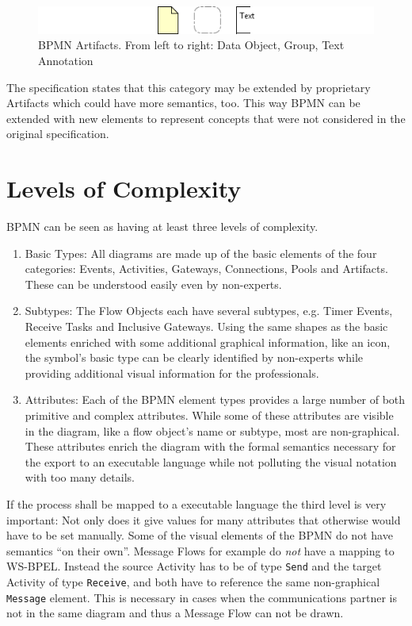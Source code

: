 \begin{figure}[ht]
	\centering
	\includegraphics[width=.75\textwidth]{figures/bpmn/artifacts.png}
	\caption[BPMN Artifacts]{BPMN Artifacts. From left to right: Data Object, Group, Text Annotation}
	\label{fig:artifacts}
\end{figure}

The specification states that this category may be extended by proprietary Artifacts which could
have more semantics, too. This way BPMN can be extended with new elements to represent concepts that
were not considered in the original specification.


\section{Levels of Complexity}
\label{sec:bpmn_complexity}

BPMN can be seen as having at least three levels of complexity.

\begin{enumerate}
	\item Basic Types: All diagrams are made up of the basic elements of the four categories:
	Events, Activities, Gateways, Connections, Pools and Artifacts. These can be understood easily
	even by non-experts.
	\item Subtypes: The Flow Objects each have several subtypes, e.g. Timer Events, Receive Tasks
	and Inclusive Gateways. Using the same shapes as the basic elements enriched with some
	additional graphical information, like an icon, the symbol's basic type can be clearly
	identified by non-experts while providing additional visual information for the professionals.
	\item Attributes: Each of the BPMN element types provides a large number of both primitive and
	complex attributes. While some of these attributes are visible in the diagram, like a flow
	object's name or subtype, most are non-graphical. These attributes enrich the diagram with the
	formal semantics necessary for the export to an executable language while not polluting the
	visual notation with too many details.
\end{enumerate}

If the process shall be mapped to a executable language the third level is very important: Not only
does it give values for many attributes that otherwise would have to be set manually. Some of the
visual elements of the BPMN do not have semantics ``on their own''. Message Flows for example do
\emph{not} have a mapping to WS-BPEL. Instead the source Activity has to be of type \texttt{Send}
and the target Activity of type \texttt{Receive}, and both have to reference the same non-graphical
\texttt{Message} element. This is necessary in cases when the communications partner is not in the
same diagram and thus a Message Flow can not be drawn.

